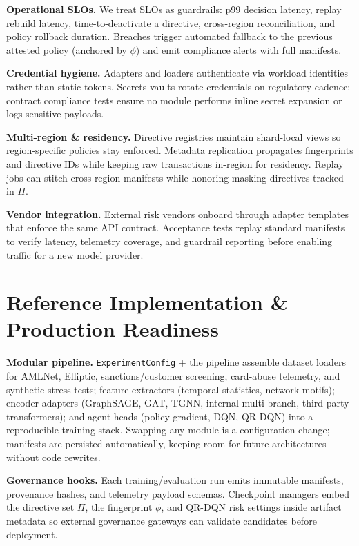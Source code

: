 \documentclass[letterpaper]{article}
\begin{document}
\textbf{Operational SLOs.}
We treat SLOs as guardrails: p99 decision latency, replay rebuild latency, time-to-deactivate a directive, cross-region reconciliation, and policy rollback duration. Breaches trigger automated fallback to the previous attested policy (anchored by $\phi$) and emit compliance alerts with full manifests.

\textbf{Credential hygiene.}
Adapters and loaders authenticate via workload identities rather than static tokens. Secrets vaults rotate credentials on regulatory cadence; contract compliance tests ensure no module performs inline secret expansion or logs sensitive payloads.

\textbf{Multi-region \& residency.}
Directive registries maintain shard-local views so region-specific policies stay enforced. Metadata replication propagates fingerprints and directive IDs while keeping raw transactions in-region for residency. Replay jobs can stitch cross-region manifests while honoring masking directives tracked in $\Pi$.

\textbf{Vendor integration.}
External risk vendors onboard through adapter templates that enforce the same API contract. Acceptance tests replay standard manifests to verify latency, telemetry coverage, and guardrail reporting before enabling traffic for a new model provider.

\section{Reference Implementation \& Production Readiness}
\label{sec:implementation}
\textbf{Modular pipeline.}
\texttt{ExperimentConfig} + the pipeline assemble dataset loaders for AMLNet, Elliptic, sanctions/customer screening, card-abuse telemetry, and synthetic stress tests; feature extractors (temporal statistics, network motifs); encoder adapters (GraphSAGE, GAT, TGNN, internal multi-branch, third-party transformers); and agent heads (policy-gradient, DQN, QR-DQN) into a reproducible training stack. Swapping any module is a configuration change; manifests are persisted automatically, keeping room for future architectures without code rewrites.

\textbf{Governance hooks.}
Each training/evaluation run emits immutable manifests, provenance hashes, and telemetry payload schemas. Checkpoint managers embed the directive set $\Pi$, the fingerprint $\phi$, and QR-DQN risk settings inside artifact metadata so external governance gateways can validate candidates before deployment.
\end{document}
